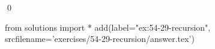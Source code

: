 
\begin{ex}
  \label{ex:54-29-recursion}
  
  \qed
\end{ex}
\begin{python0}
from solutions import *
add(label="ex:54-29-recursion",
    srcfilename='exercises/54-29-recursion/answer.tex')
\end{python0}
